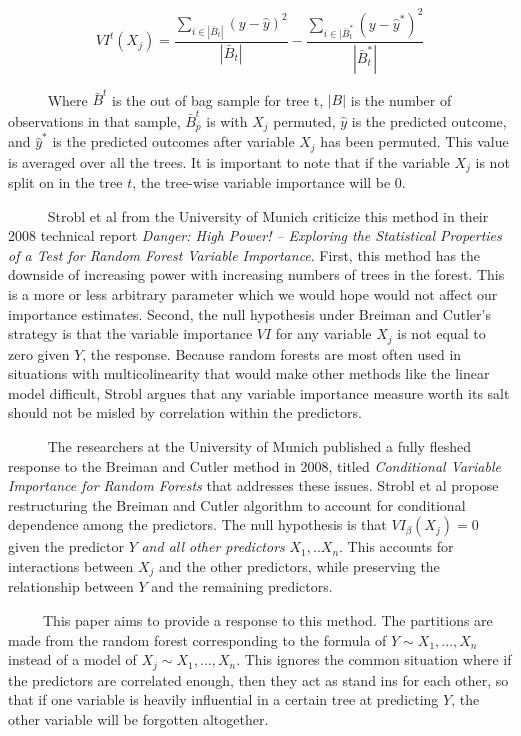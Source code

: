 \documentclass[12pt,twoside]{reedthesis}
\begin{document}
  \[VI^t(X_j) = \frac{\sum_{i \in |\bar{B}_t|} ({y} - \hat{y})^2}{|\bar{B}_t|} - \frac{\sum_{i \in |\bar{B}_t^*} ({y} - \hat{y}^*)^2}{|\bar{B}_t^*|} \]
  
  ~~~~~ Where \(\bar{B}^t\) is the out of bag sample for tree t, \(|B|\)
  is the number of observations in that sample, \(\bar{B}_p^t\) is with
  \(X_j\) permuted, \(\hat{y}\) is the predicted outcome, and
  \(\hat{y}^*\) is the predicted outcomes after variable \(X_j\) has been
  permuted. This value is averaged over all the trees. It is important to
  note that if the variable \(X_j\) is not split on in the tree \(t\), the
  tree-wise variable importance will be 0.
  
  ~~~~~ Strobl et al from the University of Munich criticize this method
  in their 2008 technical report \emph{Danger: High Power! -- Exploring
  the Statistical Properties of a Test for Random Forest Variable
  Importance}. First, this method has the downside of increasing power
  with increasing numbers of trees in the forest. This is a more or less
  arbitrary parameter which we would hope would not affect our importance
  estimates. Second, the null hypothesis under Breiman and Cutler's
  strategy is that the variable importance \(VI\) for any variable \(X_j\)
  is not equal to zero given \(Y\), the response. Because random forests
  are most often used in situations with multicolinearity that would make
  other methods like the linear model difficult, Strobl argues that any
  variable importance measure worth its salt should not be misled by
  correlation within the predictors.
  
  ~~~~~ The researchers at the University of Munich published a fully
  fleshed response to the Breiman and Cutler method in 2008, titled
  \emph{Conditional Variable Importance for Random Forests} that addresses
  these issues. Strobl et al propose restructuring the Breiman and Cutler
  algorithm to account for conditional dependence among the predictors.
  The null hypothesis is that \(VI_{\beta}(X_j) = 0\) given the predictor
  \(Y\) \emph{and all other predictors} \(X_1,..X_n\). This accounts for
  interactions between \(X_j\) and the other predictors, while preserving
  the relationship between \(Y\) and the remaining predictors.
  
  ~~~~~This paper aims to provide a response to this method. The
  partitions are made from the random forest corresponding to the formula
  of \(Y \sim X_1,...,X_n\) instead of a model of
  \(X_j \sim X_1,...,X_n\). This ignores the common situation where if the
  predictors are correlated enough, then they act as stand ins for each
  other, so that if one variable is heavily influential in a certain tree
  at predicting \(Y\), the other variable will be forgotten altogether.
  
\end{document}
